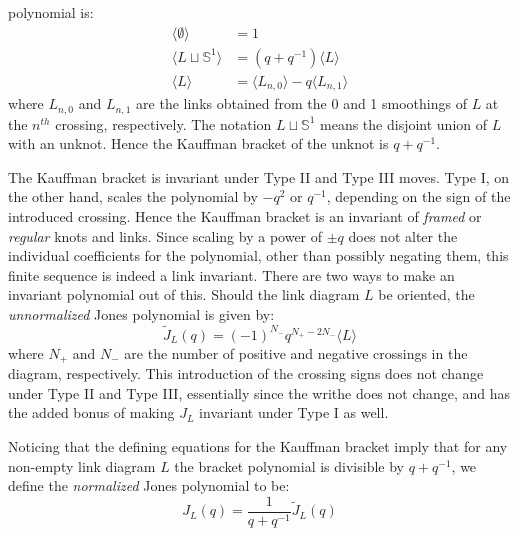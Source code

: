         polynomial is:
        \begin{align}
            \label{eqn:kauffman_bracket}
            \langle\emptyset\rangle&=1\\
            \langle{L\sqcup\mathbb{S}^{1}}\rangle&=(q+q^{-1})\langle{L}\rangle\\
            \langle{L}\rangle&=
                \langle{L_{n,0}}\rangle-q\langle{L_{n,1}}\rangle
        \end{align}
        where $L_{n,0}$ and $L_{n,1}$ are the links obtained from the
        0 and 1 smoothings of $L$ at the $n^{th}$ crossing, respectively. The
        notation $L\sqcup\mathbb{S}^{1}$ means the disjoint union of
        $L$ with an unknot. Hence the Kauffman bracket of the
        unknot is $q+q^{-1}$.
        \par\hfill\par
        The Kauffman bracket is invariant under Type II and Type III moves.
        Type I, on the other hand, scales the polynomial by
        $-q^{2}$ or $q^{-1}$,
        depending on the sign of the introduced crossing. Hence the Kauffman
        bracket is an invariant of \textit{framed} or \textit{regular} knots
        and links. Since scaling by a power of $\pm{q}$ does not alter the
        individual coefficients for the polynomial, other than possibly
        negating them, this finite sequence is indeed a link
        invariant. There are two ways to make an invariant polynomial out of
        this. Should the link diagram $L$ be oriented, the
        \textit{unnormalized} Jones polynomial is given by:
        \begin{equation}
            \label{eqn:unnormalized_jones}
            \tilde{J}_{L}(q)=(-1)^{N_{-}}q^{N_{+}-2N_{-}}\langle{L}\rangle
        \end{equation}
        where $N_{+}$ and $N_{-}$ are the number of positive and negative
        crossings in the diagram, respectively. This introduction of the
        crossing signs does not change under Type II and Type III, essentially
        since the writhe does not change, and has the added bonus of making
        $J_{L}$ invariant under Type I as well.
        \par\hfill\par
        Noticing that the defining
        equations for the Kauffman bracket imply that for any non-empty link
        diagram $L$ the bracket polynomial is divisible by $q+q^{-1}$, we
        define the \textit{normalized} Jones polynomial to be:
        \begin{equation}
            J_{L}(q)=\frac{1}{q+q^{-1}}\tilde{J}_{L}(q)
        \end{equation}
